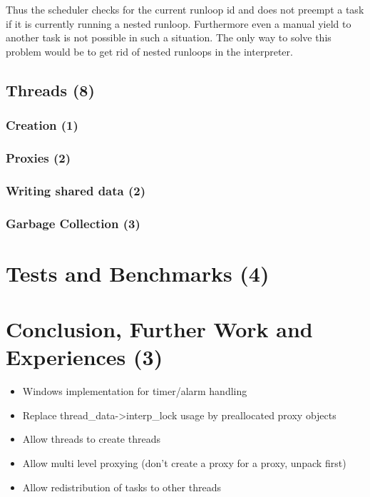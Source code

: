 \documentclass[bachelor,english]{hgbthesis}
\begin{document}
Thus the scheduler checks for the current runloop id and does not preempt a task if it is currently running a nested runloop. Furthermore even a manual yield to another task is not possible in such a situation. The only way to solve this problem would be to get rid of nested runloops in the interpreter.

\section{Threads (8)}

\subsection{Creation (1)}

\subsection{Proxies (2)}

\subsection{Writing shared data (2)}

\subsection{Garbage Collection (3)}

\chapter{Tests and Benchmarks (4)}

\chapter{Conclusion, Further Work and Experiences (3)}

\begin{itemize}
\item Windows implementation for timer/alarm handling
\item Replace thread\_data->interp\_lock usage by preallocated proxy objects
\item Allow threads to create threads
\item Allow multi level proxying (don't create a proxy for a proxy, unpack first)
\item Allow redistribution of tasks to other threads
\end{itemize}



\end{document}

